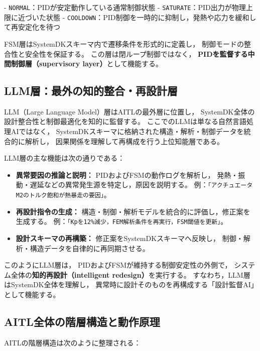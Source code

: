 - \texttt{NORMAL}：PIDが安定動作している通常制御状態  
- \texttt{SATURATE}：PID出力が物理上限に近づいた状態  
- \texttt{COOLDOWN}：PID制御を一時的に抑制し，発熱や応力を緩和して再安定化を待つ  

FSM層はSystemDKスキーマ内で遷移条件を形式的に定義し，
制御モードの整合性と安全性を保証する。
この層は閉ループ制御ではなく，
\textbf{PIDを監督する中間制御層（supervisory layer）}として機能する。

\subsection{LLM層：最外の知的整合・再設計層}
LLM（Large Language Model）層はAITLの最外層に位置し，
SystemDK全体の設計整合性と制御最適化を知的に監督する。
ここでのLLMは単なる自然言語処理AIではなく，
SystemDKスキーマに格納された構造・解析・制御データを統合的に解析し，
因果関係を理解して再構成を行う上位知能層である。

LLM層の主な機能は次の通りである：

\begin{itemize}
  \item \textbf{異常要因の推論と説明：}  
  PIDおよびFSMの動作ログを解析し，
  発熱・振動・遅延などの異常発生源を特定し，原因を説明する。  
  例：\texttt{「アクチュエータM2のトルク飽和が熱暴走の要因」}。

  \item \textbf{再設計指令の生成：}  
  構造・制御・解析モデルを統合的に評価し，修正案を生成する。  
  例：\texttt{「Kpを12\%減少，FEM解析条件を再実行，FSM閾値を更新」}。

  \item \textbf{設計スキーマの再構築：}  
  修正案をSystemDKスキーマへ反映し，
  制御・解析・構造データを自律的に再同期させる。
\end{itemize}

このようにLLM層は，
PIDおよびFSMが維持する制御安定性の外側で，
システム全体の\textbf{知的再設計（intelligent redesign）}を実行する。
すなわち，LLM層はSystemDK全体を理解し，
異常時に設計そのものを再構成する「設計監督AI」として機能する。

\subsection{AITL全体の階層構造と動作原理}
AITLの階層構造は次のように整理される：

